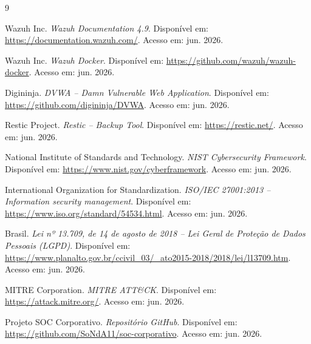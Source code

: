 \documentclass[12pt,a4paper]{article}
\begin{document}
    \begin{thebibliography}{9}

    Wazuh Inc. \textit{Wazuh Documentation 4.9}. 
    Disponível em: \url{https://documentation.wazuh.com/}. Acesso em: jun. 2026.

    Wazuh Inc. \textit{Wazuh Docker}. 
    Disponível em: \url{https://github.com/wazuh/wazuh-docker}. Acesso em: jun. 2026.

    Digininja. \textit{DVWA -- Damn Vulnerable Web Application}. 
    Disponível em: \url{https://github.com/digininja/DVWA}. Acesso em: jun. 2026.

    Restic Project. \textit{Restic -- Backup Tool}. 
    Disponível em: \url{https://restic.net/}. Acesso em: jun. 2026.

    National Institute of Standards and Technology. \textit{NIST Cybersecurity Framework}. 
    Disponível em: \url{https://www.nist.gov/cyberframework}. Acesso em: jun. 2026.

    International Organization for Standardization. \textit{ISO/IEC 27001:2013 -- Information security management}. 
    Disponível em: \url{https://www.iso.org/standard/54534.html}. Acesso em: jun. 2026.

    Brasil. \textit{Lei nº 13.709, de 14 de agosto de 2018 -- Lei Geral de Proteção de Dados Pessoais (LGPD)}. 
    Disponível em: \url{https://www.planalto.gov.br/ccivil_03/_ato2015-2018/2018/lei/l13709.htm}. Acesso em: jun. 2026.

    MITRE Corporation. \textit{MITRE ATT\&CK\textregistered}. 
    Disponível em: \url{https://attack.mitre.org/}. Acesso em: jun. 2026.

    Projeto SOC Corporativo. \textit{Repositório GitHub}. 
    Disponível em: \url{https://github.com/SoNdA11/soc-corporativo}. Acesso em: jun. 2026.

    \end{thebibliography}

    
\end{document}
